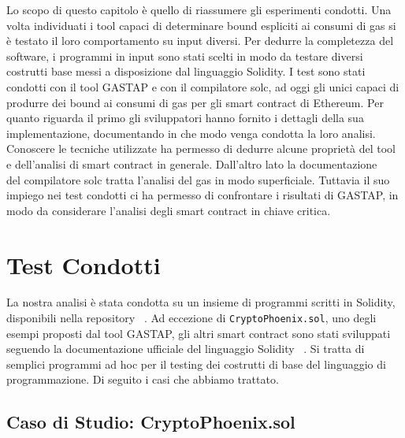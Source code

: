 
Lo scopo di questo capitolo è quello di riassumere gli esperimenti condotti.\newline
\indent Una volta individuati i tool capaci di determinare bound espliciti ai consumi di gas si è testato il loro comportamento su input diversi. Per dedurre la completezza del software, i programmi in input sono stati scelti in modo da testare diversi costrutti base messi a disposizione dal linguaggio Solidity.\newline
\indent I test sono stati condotti con il tool GASTAP e con il compilatore solc, ad oggi gli unici capaci di produrre dei bound ai consumi di gas per gli smart contract di Ethereum. Per quanto riguarda il primo gli sviluppatori hanno fornito i dettagli della sua implementazione, documentando in che modo venga condotta la loro analisi. Conoscere le tecniche utilizzate ha permesso di dedurre alcune proprietà del tool e dell'analisi di smart contract in generale. Dall'altro lato la documentazione ~\cite{solidity-docs} del compilatore solc tratta l'analisi del gas in modo superficiale. Tuttavia il suo impiego nei test condotti ci ha permesso di confrontare i risultati di GASTAP, in modo da considerare l'analisi degli smart contract in chiave critica.\newline

\newpage




    


\newpage

\section{Test Condotti}

La nostra analisi è stata condotta su un insieme di programmi scritti in Solidity, disponibili nella repository ~\cite{melastone-sc}.\newline
\indent Ad eccezione di \verb|CryptoPhoenix.sol|, uno degli esempi proposti dal tool GASTAP, gli altri smart contract sono stati sviluppati seguendo la documentazione ufficiale del linguaggio Solidity ~\cite{solidity-docs}. Si tratta di semplici programmi ad hoc per il testing dei costrutti di base del linguaggio di programmazione. Di seguito i casi che abbiamo trattato.\newline

    \subsection{Caso di Studio: CryptoPhoenix.sol}
    
